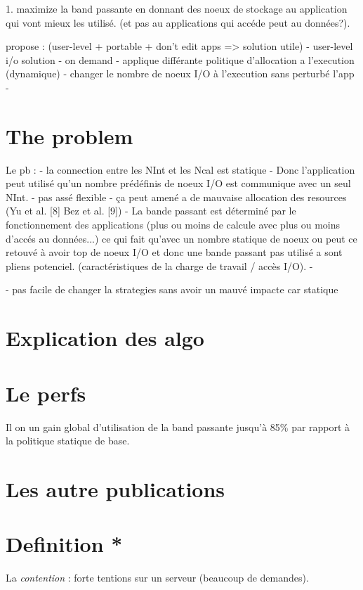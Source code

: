 \documentclass[10pt, a4paper]{article}
\begin{document}
1. maximize la band passante en donnant des noeux de stockage au application qui vont mieux les utilisé. (et pas au applications qui accéde peut au données?).

propose : (user-level + portable + don't edit apps => solution utile)
- user-level i/o solution
- on demand
- applique différante politique d'allocation a l'execution (dynamique)
- changer le nombre de noeux I/O à l'execution sans perturbé l'app
-

\section{The problem}


Le pb :
- la connection entre les NInt et les Ncal est statique
- Donc l'application peut utilisé qu'un nombre prédéfinis de noeux I/O est communique avec un seul NInt.
- pas assé flexible
- ça peut amené a de mauvaise allocation des resources (Yu et al. [8] Bez et al. [9])
- La bande passant est déterminé par le fonctionnement des applications (plus ou moins de calcule avec plus ou moins d'accés au données...) ce qui fait qu'avec un nombre statique de noeux ou peut ce retouvé à avoir top de noeux I/O et donc une bande passant pas utilisé a sont pliens potenciel. (caractéristiques de la charge de travail / accès I/O).
- 

- pas facile de changer la strategies sans avoir un mauvé impacte car statique

\section{Explication des algo}


\section{Le perfs}

Il on un gain global d'utilisation de la band passante jusqu'à 85\% par rapport à la politique statique de base.

\section{Les autre publications}


\section{Definition *}

La \emph{contention} : forte tentions sur un serveur (beaucoup de demandes).
\end{document}
